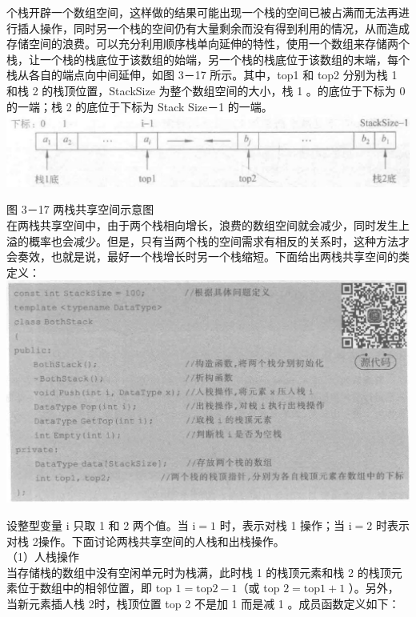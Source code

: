 \documentclass[10pt]{article}
\begin{document}
个栈开辟一个数组空间，这样做的结果可能出现一个栈的空间已被占满而无法再进行插人操作，同时另一个栈的空间仍有大量剩余而没有得到利用的情况，从而造成存储空间的浪费。可以充分利用顺序栈单向延伸的特性，使用一个数组来存储两个栈，让一个栈的栈底位于该数组的始端，另一个栈的栈底位于该数组的末端，每个栈从各自的端点向中间延伸，如图 3－17 所示。其中，top1 和 top2 分别为栈 1 和栈 2 的栈顶位置，StackSize 为整个数组空间的大小，栈 1 。的底位于下标为 0 的一端；栈 2 的底位于下标为 Stack Size－1 的一端。\\
\includegraphics[max width=\textwidth, center]{2025_06_06_704745ea57b15b2333e5g-100}

图 3－17 两栈共享空间示意图\\
在两栈共享空间中，由于两个栈相向增长，浪费的数组空间就会减少，同时发生上溢的概率也会减少。但是，只有当两个栈的空间需求有相反的关系时，这种方法才会奏效，也就是说，最好一个栈增长时另一个栈缩短。下面给出两栈共享空间的类定义：\\
\includegraphics[max width=\textwidth, center]{2025_06_06_704745ea57b15b2333e5g-100(1)}

设整型变量 i 只取 1 和 2 两个值。当 $\mathrm{i}=1$ 时，表示对栈 1 操作；当 $\mathrm{i}=2$ 时表示对栈 2操作。下面讨论两栈共享空间的人栈和出栈操作。\\
（1）人栈操作\\
当存储栈的数组中没有空闲单元时为栈满，此时栈 1 的栈顶元素和栈 2 的栈顶元素位于数组中的相邻位置，即 top $1=\mathrm{top} 2-1$（或 top $2=\mathrm{top} 1+1$ ）。另外，当新元素插人栈 2时，栈顶位置 top 2 不是加 1 而是减 1 。成员函数定义如下：
\end{document}

